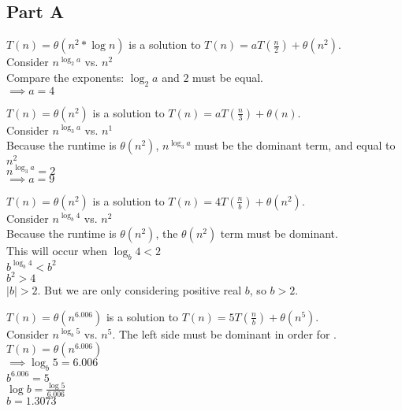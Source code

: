 \documentclass[12pt,twoside]{article}
\begin{document}

\begin{problems}

\section*{Part A}

\problem  %

\begin{problemparts}
\problempart $T(n) = \theta(n^2*\log n)$ is a solution to $T(n) = aT(\frac{n}{2}) + \theta(n^2)$. \\
Consider $n^{\log_2 a}$ vs. $n^2$ \\
Compare the exponents: $\log_2 a$ and $2$ must be equal. \\
$\implies a=4$

\bigskip


\problempart $T(n) = \theta(n^2)$ is a solution to $T(n) = aT(\frac{n}{3}) + \theta(n)$. \\
Consider $n^{\log_3 a}$ vs. $n^1$ \\
Because the runtime is $\theta(n^2)$, $n^{\log_3 a}$ must be the dominant term, and equal to $n^2$ \\
$n^{\log_3 a} = 2$ \\
$\implies a=9$

\bigskip

\problempart $T(n) = \theta(n^2)$ is a solution to $T(n) = 4T(\frac{n}{b}) + \theta(n^2)$. \\
Consider $n^{\log_b 4}$ vs. $n^2$ \\
Because the runtime is $\theta(n^2)$, the $\theta(n^2)$ term must be dominant. \\
This will occur when $\log_b 4 < 2$ \\
$b^{\log_b 4} < b^2$ \\
$b^2 > 4$ \\
$|b| > 2$. But we are only considering positive real $b$, so $b>2$.

\bigskip

\problempart $T(n) = \theta(n^{6.006})$ is a solution to $T(n) = 5T(\frac{n}{b}) + \theta(n^5)$. \\
Consider $n^{\log_b 5}$ vs. $n^5$. The left side must be dominant in order for .$T(n) = \theta(n^{6.006})$ \\
$\implies \log_b 5 = 6.006$\\
$b^{6.006} = 5$ \\
$\log b = \frac{\log 5}{6.006} $\\
$b = 1.3073$


\end{problemparts}
\end{problems}
\end{document}
